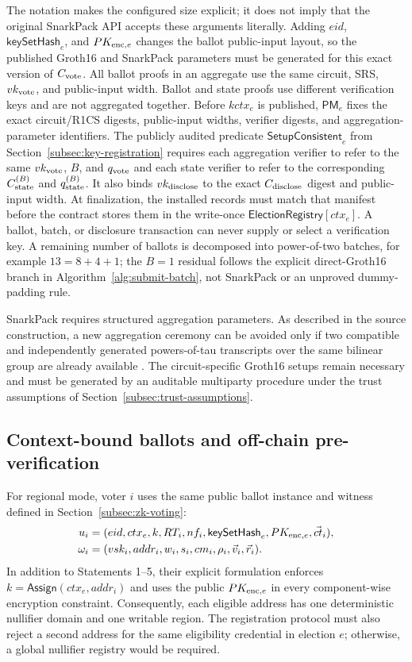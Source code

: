 \documentclass[pdflatex,sn-mathphys-num]{sn-jnl}%
\theoremstyle{thmstyleone}%
\theoremstyle{thmstyletwo}%
\theoremstyle{thmstylethree}%
\begin{document}
The notation makes the configured size explicit; it does not imply that the original SnarkPack API accepts these arguments literally. Adding $eid$, $\mathsf{keySetHash}_e$, and $PK_{{\rm enc},e}$ changes the ballot public-input layout, so the published Groth16 and SnarkPack parameters must be generated for this exact version of $C_{\rm vote}$. All ballot proofs in an aggregate use the same circuit, SRS, $vk_{\rm vote}$, and public-input width. Ballot and state proofs use different verification keys and are not aggregated together. Before $kctx_e$ is published, $\mathsf{PM}_e$ fixes the exact circuit/R1CS digests, public-input widths, verifier digests, and aggregation-parameter identifiers. The publicly audited predicate $\mathsf{SetupConsistent}_e$ from Section~\ref{subsec:key-registration} requires each aggregation verifier to refer to the same $vk_{\rm vote}$, $B$, and $q_{\rm vote}$ and each state verifier to refer to the corresponding $C_{\rm state}^{(B)}$ and $q_{\rm state}^{(B)}$.  It also binds $vk_{\rm disclose}$ to the exact $C_{\rm disclose}$ digest and public-input width. At finalization, the installed records must match that manifest before the contract stores them in the write-once $\mathsf{ElectionRegistry}[ctx_e]$. A ballot, batch, or disclosure transaction can never supply or select a verification key. A remaining number of ballots is decomposed into power-of-two batches, for example $13=8+4+1$; the $B=1$ residual follows the explicit direct-Groth16 branch in Algorithm~\ref{alg:submit-batch}, not SnarkPack or an unproved dummy-padding rule.

SnarkPack requires structured aggregation parameters. As described in the source construction, a new aggregation ceremony can be avoided only if two compatible and independently generated powers-of-tau transcripts over the same bilinear group are already available \cite{bib128}. The circuit-specific Groth16 setups remain necessary and must be generated by an auditable multiparty procedure under the trust assumptions of Section~\ref{subsec:trust-assumptions}.

\subsection{Context-bound ballots and off-chain pre-verification}\label{subsec:batch-ballots}

For regional mode, voter $i$ uses the same public ballot instance and witness defined in Section~\ref{subsec:zk-voting}:
\[
\begin{aligned}
 u_i&=(eid,ctx_e,k,RT_i,nf_i,\mathsf{keySetHash}_e,
       PK_{{\rm enc},e},\vec{ct}_i),\\
 \omega_i&=(vsk_i,addr_i,w_i,s_i,cm_i,\rho_i,\vec v_i,\vec r_i).
\end{aligned}
\]
In addition to Statements 1--5, their explicit formulation enforces $k=\mathsf{Assign}(ctx_e,addr_i)$ and uses the public $PK_{{\rm enc},e}$ in every component-wise encryption constraint. Consequently, each eligible address has one deterministic nullifier domain and one writable region. The registration protocol must also reject a second address for the same eligibility credential in election $e$; otherwise, a global nullifier registry would be required.
\end{document}
